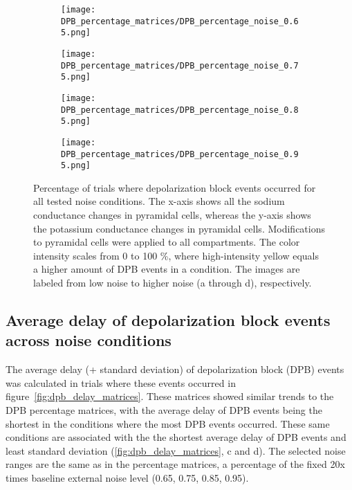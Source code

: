 \begin{figure}[htbp]
    \centering
    \begin{subfigure}{0.48\textwidth}
        \texttt{[image: DPB\_percentage\_matrices/DPB\_percentage\_noise\_0.65.png]}
        \caption{} %
    \end{subfigure}\hfill
    \begin{subfigure}{0.48\textwidth}
        \texttt{[image: DPB\_percentage\_matrices/DPB\_percentage\_noise\_0.75.png]}
        \caption{} %
    \end{subfigure}

    \bigskip %

    \begin{subfigure}{0.48\textwidth}
        \texttt{[image: DPB\_percentage\_matrices/DPB\_percentage\_noise\_0.85.png]}
        \caption{} %
    \end{subfigure}\hfill
    \begin{subfigure}{0.48\textwidth}
        \texttt{[image: DPB\_percentage\_matrices/DPB\_percentage\_noise\_0.95.png]}
        \caption{} %
    \end{subfigure}

    \caption[DPB percentage matrices]{Percentage of trials where depolarization block events occurred for all tested noise conditions.
    The x-axis shows all the sodium conductance changes in pyramidal cells, whereas the y-axis shows the potassium conductance changes in pyramidal cells.
    Modifications to pyramidal cells were applied to all compartments.
    The color intensity scales from 0 to 100 \%, where high-intensity yellow equals a higher amount of DPB events in a condition.
    The images are labeled from low noise to higher noise (a through d), respectively.}\label{fig:dpb_percentage_matrices}
\end{figure}

\subsection{Average delay of depolarization block events across noise conditions}
The average delay (+ standard deviation) of depolarization block (DPB) events was calculated in trials where these events occurred in figure~\ref{fig:dpb_delay_matrices}.
These matrices showed similar trends to the DPB percentage matrices, with the average delay of DPB events being the shortest in the conditions where the most DPB events occurred.
These same conditions are associated with the the shortest average delay of DPB events and least standard deviation (\ref{fig:dpb_delay_matrices}, c and d).
The selected noise ranges are the same as in the percentage matrices, a percentage of the fixed 20x times baseline external noise level (0.65, 0.75, 0.85, 0.95).


